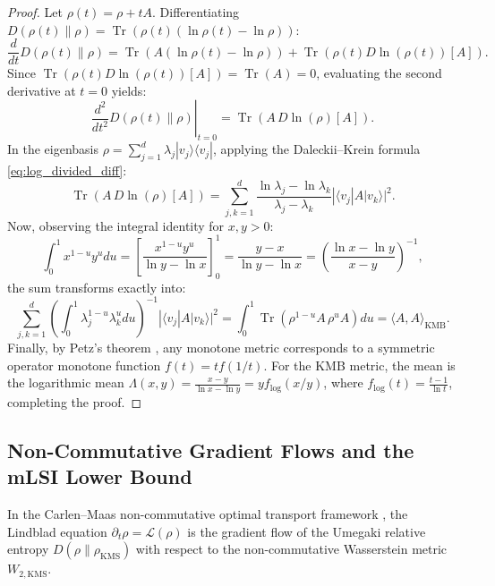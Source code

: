 \documentclass[11pt,a4paper]{article}
\theoremstyle{plain}
\theoremstyle{definition}
\DeclareMathOperator{\Tr}{Tr}
\newcommand{\KMS}{\mathrm{KMS}}
\begin{document}
\begin{proof}
Let $\rho(t) = \rho + t A$. Differentiating $D(\rho(t) \parallel \rho) = \Tr(\rho(t)(\ln\rho(t) - \ln\rho))$:
\begin{equation}
\frac{d}{dt} D(\rho(t) \parallel \rho) = \Tr\left( A (\ln\rho(t) - \ln\rho) \right) + \Tr\left( \rho(t) D\ln(\rho(t))[A] \right).
\end{equation}
Since $\Tr(\rho(t) D\ln(\rho(t))[A]) = \Tr(A) = 0$, evaluating the second derivative at $t = 0$ yields:
\begin{equation}
\left. \frac{d^2}{dt^2} D(\rho(t) \parallel \rho) \right|_{t=0} = \Tr\left( A \, D\ln(\rho)[A] \right).
\end{equation}
In the eigenbasis $\rho = \sum_{j=1}^d \lambda_j |v_j\rangle\langle v_j|$, applying the Daleckii--Krein formula \eqref{eq:log_divided_diff}:
\begin{equation}
\Tr\left( A \, D\ln(\rho)[A] \right) = \sum_{j,k=1}^d \frac{\ln\lambda_j - \ln\lambda_k}{\lambda_j - \lambda_k} |\langle v_j | A | v_k \rangle|^2.
\end{equation}
Now, observing the integral identity for $x, y > 0$:
\begin{equation}
\int_0^1 x^{1-u} y^u du = \left[ \frac{x^{1-u} y^u}{\ln y - \ln x} \right]_0^1 = \frac{y - x}{\ln y - \ln x} = \left( \frac{\ln x - \ln y}{x - y} \right)^{-1},
\end{equation}
the sum transforms exactly into:
\begin{equation}
\sum_{j,k=1}^d \left( \int_0^1 \lambda_j^{1-u} \lambda_k^u du \right)^{-1} |\langle v_j | A | v_k \rangle|^2 = \int_0^1 \Tr\left( \rho^{1-u} A \, \rho^u A \right) du = \langle A, A \rangle_{\mathrm{KMB}}.
\end{equation}
Finally, by Petz's theorem \cite{Petz1996Chentsov,Petz2008}, any monotone metric corresponds to a symmetric operator monotone function $f(t) = t f(1/t)$. For the KMB metric, the mean is the logarithmic mean $\Lambda(x, y) = \frac{x - y}{\ln x - \ln y} = y f_{\mathrm{log}}(x/y)$, where $f_{\mathrm{log}}(t) = \frac{t - 1}{\ln t}$, completing the proof.
\end{proof}

\subsection{Non-Commutative Gradient Flows and the mLSI Lower Bound}
In the Carlen--Maas non-commutative optimal transport framework \cite{CarlenMaas2014,CarlenMaas2017,CarlenMaas2020}, the Lindblad equation $\partial_t \rho = \mathcal{L}(\rho)$ is the gradient flow of the Umegaki relative entropy $D(\rho \parallel \rho_{\KMS})$ with respect to the non-commutative Wasserstein metric $W_{2, \KMS}$.
\end{document}
